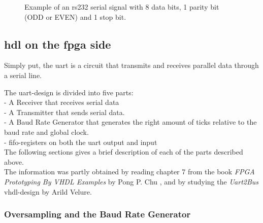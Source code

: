 \documentclass[main.tex]{subfiles}
\begin{document}
\begin{figure}[!h]
\begin{center}

\caption{Example of an \gls{rs232} serial signal with 8 data bits, 1 parity bit (ODD or EVEN) and 1 stop bit.}
\label{fig:rs232}

\end{center}
\end{figure}





\subsection{\acrshort{hdl} on the \gls{fpga} side}

Simply put, the \gls{uart} is a circuit that transmits and receives parallel data through a serial line. \cite{chu08}

The \gls{uart}-design is divided into five parts:\\
- A Receiver that receives serial data\\
- A Transmitter that sends serial data.\\
- A Baud Rate Generator that generates the right amount of ticks relative to the baud rate and global clock.\\
- \Gls{fifo}-registers on both the \gls{uart} output and input\\

The following sections gives a brief description of each of the parts described above. \\
The information was partly obtained by reading chapter 7 from the book \textit{FPGA Prototyping By VHDL Examples} by Pong P. Chu \cite{chu08}, and by studying the \textit{Uart2Bus} \acrshort{vhdl}-design by Arild Velure.

\subsubsection{Oversampling and the Baud Rate Generator}
\end{document}
